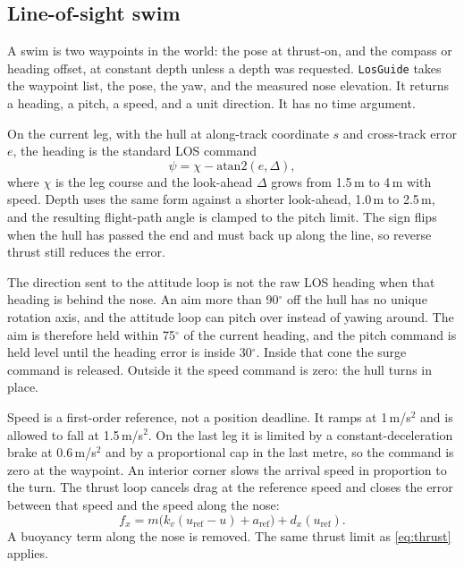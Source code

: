 \documentclass[conference]{IEEEtran}
\begin{document}
\subsection{Line-of-sight swim}
\label{sec:los}
A swim is two waypoints in the world: the pose at thrust-on, and the compass or heading offset, at constant depth unless a depth was requested. \texttt{LosGuide} takes the waypoint list, the pose, the yaw, and the measured nose elevation. It returns a heading, a pitch, a speed, and a unit direction. It has no time argument.

On the current leg, with the hull at along-track coordinate $s$ and cross-track error $e$, the heading is the standard LOS command
\begin{equation}
\psi = \chi - \mathrm{atan2}(e, \Delta),
\label{eq:los}
\end{equation}
where $\chi$ is the leg course and the look-ahead $\Delta$ grows from 1.5\,m to 4\,m with speed. Depth uses the same form against a shorter look-ahead, 1.0\,m to 2.5\,m, and the resulting flight-path angle is clamped to the pitch limit. The sign flips when the hull has passed the end and must back up along the line, so reverse thrust still reduces the error.

The direction sent to the attitude loop is not the raw LOS heading when that heading is behind the nose. An aim more than 90$^\circ$ off the hull has no unique rotation axis, and the attitude loop can pitch over instead of yawing around. The aim is therefore held within 75$^\circ$ of the current heading, and the pitch command is held level until the heading error is inside 30$^\circ$. Inside that cone the surge command is released. Outside it the speed command is zero: the hull turns in place.

Speed is a first-order reference, not a position deadline. It ramps at 1\,m/s$^{2}$ and is allowed to fall at 1.5\,m/s$^{2}$. On the last leg it is limited by a constant-deceleration brake at 0.6\,m/s$^{2}$ and by a proportional cap in the last metre, so the command is zero at the waypoint. An interior corner slows the arrival speed in proportion to the turn. The thrust loop cancels drag at the reference speed and closes the error between that speed and the speed along the nose:
\begin{equation}
f_{x} = m\big(k_{v}(u_{\mathrm{ref}}-u) + a_{\mathrm{ref}}\big) + d_{x}(u_{\mathrm{ref}}).
\label{eq:surge}
\end{equation}
A buoyancy term along the nose is removed. The same thrust limit as \eqref{eq:thrust} applies.
\end{document}
